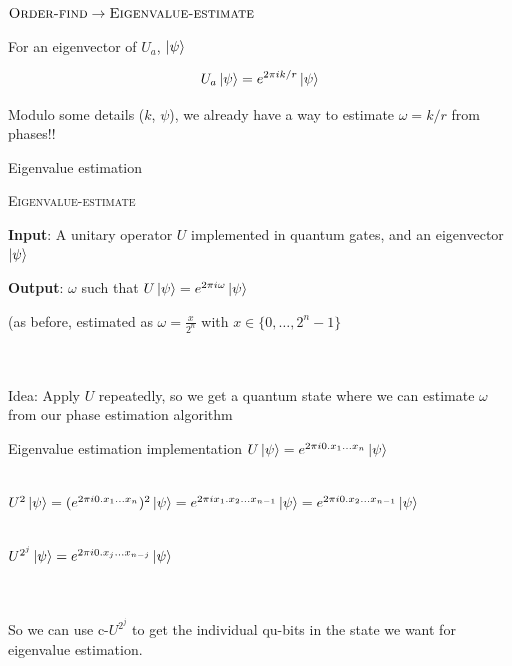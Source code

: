 \documentclass{beamer}
\begin{document}
\begin{frame}{$\textsc{Order-find} \to \textsc{Eigenvalue-estimate}$}
    
    For an eigenvector of $U_a$, $\ket{\psi}$
    
    $$U_a \ket{\psi} = e^{2 \pi i k/r } \ket{\psi}$$ \pause
    
    Modulo some details ($k$, $\psi$), we already have a way to estimate $\omega = k/r$ from phases!! 
 
\end{frame}
\begin{frame}{Eigenvalue estimation}

    \textsc{Eigenvalue-estimate}
    
    \textbf{Input}: A unitary operator $U$ implemented in quantum gates, and an eigenvector $\ket{\psi}$
    
    \textbf{Output}: $\omega$ such that $U \ket{\psi} = e^{2 \pi i \omega} \ket{\psi}$ \pause
    
    (as before, estimated as $\omega = \frac{x}{2^n}$ with $x \in \{ 0, \ldots, 2^n - 1 \}$
    
    \pause
    
    \ \\
    \ \\
    
    Idea: Apply $U$ repeatedly, so we get a quantum state where we can estimate $\omega$ from our phase estimation algorithm
 
\end{frame}
\begin{frame}{Eigenvalue estimation implementation}
    $U \ket{\psi} = e^{2 \pi i 0.x_1 \ldots x_n} \ket{\psi}$ \pause
    
    \  \\
    
    $U^2 \ket{\psi} = (e^{2 \pi i 0.x_1 \ldots x_n})^2 \ket{\psi} = e^{2 \pi i x_1.x_2 \ldots x_{n-1}} \ket{\psi} = e^{2 \pi i 0.x_2 \ldots x_{n-1}} \ket{\psi}$ \pause
    
    \ \\
    
    $U^{2^j} \ket{\psi} = e^{2 \pi i 0.x_j \ldots x_{n-j}} \ket{\psi}$ \pause
    
    \ \\
    \ \\
    So we can use c-$U^{2^j}$ to get the individual qu-bits in the state we want for eigenvalue estimation.
    
\end{frame}
\end{document}
